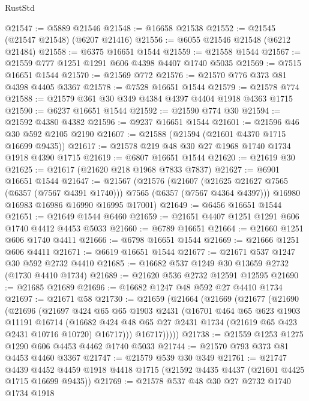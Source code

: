 \begin{lexlean}{RustStd}
\begin{coremodule}
@21547 := @5889 @21546
@21548 := @16658 @21538
@21552 := @21545 (@21547 @21548) (@6207 @21416)
@21556 := @6055 @21546 @21548 (@6212 @21484)
@21558 := @6375 @16651 @1544
@21559 := @21558 @1544
@21567 := @21559 @777 @1251 @1291 @606 @4398 @4407 @1740 @5035
@21569 := @7515 @16651 @1544
@21570 := @21569 @772
@21576 := @21570 @776 @373 @81 @4398 @4405 @3367
@21578 := @7528 @16651 @1544
@21579 := @21578 @774
@21588 := @21579 @361 @30 @349 @4384 @4397 @4404 @1918 @4363 @1715
@21590 := @6237 @16651 @1544
@21592 := @21590 @774 @30
@21594 := @21592 @4380 @4382
@21596 := @9237 @16651 @1544
@21601 := @21596 @46 @30 @592 @2105 @2190
@21607 := @21588 (@21594 (@21601 @4370 @1715 @16699 @9435))
@21617 := @21578 @219 @48 @30 @27 @1968 @1740 @1734 @1918 @4390 @1715
@21619 := @6807 @16651 @1544
@21620 := @21619 @30
@21625 := @21617 (@21620 @218 @1968 @7833 @7837)
@21627 := @6901 @16651 @1544
@21647 := @21567
    (@21576
      (@21607 (@21625 @21627 @7565 (@6357 (@7567 @4391 @1740))) @7565 (@6357 (@7567 @4364 @4397)))
      @16980
      @16983
      @16986
      @16990
      @16995
      @17001)
@21649 := @6456 @16651 @1544
@21651 := @21649 @1544 @6460
@21659 := @21651 @4407 @1251 @1291 @606 @1740 @4412 @4453 @5033
@21660 := @6789 @16651
@21664 := @21660 @1251 @606 @1740 @4411
@21666 := @6798 @16651 @1544
@21669 := @21666 @1251 @606 @4411
@21671 := @6619 @16651 @1544
@21677 := @21671 @537 @1247 @30 @592 @2732 @4410
@21685 := @16682 @537 @1249 @30 @13659 @2732 (@1730 @4410 @1734)
@21689 := @21620 @536 @2732 @12591 @12595
@21690 := @21685 @21689
@21696 := @16682 @1247 @48 @592 @27 @4410 @1734
@21697 := @21671 @58
@21730 := @21659
    (@21664
      (@21669
        (@21677
          (@21690
            (@21696
              (@21697
                @424
                @65
                @65
                @1903
                @2431
                (@16701
                  @464
                  @65
                  @623
                  @1903
                  @11191
                  @16714
                  (@16682
                    @424
                    @48
                    @65
                    @27
                    @2431
                    @1734
                    (@21619 @65 @423 @2431 @10716 @10720)
                    @16717)))
              @16717)))))
@21738 := @21559 @1253 @1275 @1290 @606 @4453 @4462 @1740 @5033
@21744 := @21570 @793 @373 @81 @4453 @4460 @3367
@21747 := @21579 @539 @30 @349
@21761 := @21747
    @4439
    @4452
    @4459
    @1918
    @4418
    @1715
    (@21592 @4435 @4437 (@21601 @4425 @1715 @16699 @9435))
@21769 := @21578 @537 @48 @30 @27 @2732 @1740 @1734 @1918

\end{coremodule}
\end{lexlean}
